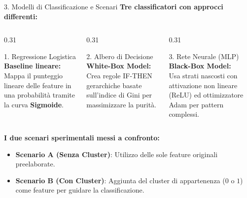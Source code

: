 \documentclass[aspectratio=169,xcolor=table]{beamer}
\begin{document}
\begin{frame}{3. Modelli di Classificazione e Scenari}
  \textbf{Tre classificatori con approcci differenti:}
  \vspace{0.15cm}
  \begin{columns}[t]
    \begin{column}{0.31\textwidth}
      \begin{block}{1. Regressione Logistica}
        \scriptsize
        \textbf{Baseline lineare:}\\
        Mappa il punteggio lineare delle feature in una probabilità tramite la curva \textbf{Sigmoide}.
      \end{block}
    \end{column}
    \begin{column}{0.31\textwidth}
      \begin{block}{2. Albero di Decisione}
        \scriptsize
        \textbf{White-Box Model:}\\
        Crea regole IF-THEN gerarchiche basate sull'indice di Gini per massimizzare la purità.
      \end{block}
    \end{column}
    \begin{column}{0.31\textwidth}
      \begin{block}{3. Rete Neurale (MLP)}
        \scriptsize
        \textbf{Black-Box Model:}\\
        Usa strati nascosti con attivazione non lineare (ReLU) ed ottimizzatore Adam per pattern complessi.
      \end{block}
    \end{column}
  \end{columns}
  
  \vspace{0.3cm}
  \textbf{I due scenari sperimentali messi a confronto:}
  \vspace{0.1cm}
  \begin{itemize}
    \item \textbf{Scenario A (Senza Cluster)}: Utilizzo delle sole feature originali preelaborate.
    \item \textbf{Scenario B (Con Cluster)}: Aggiunta del cluster di appartenenza ($0$ o $1$) come feature per guidare la classificazione.
  \end{itemize}
\end{frame}
\end{document}

